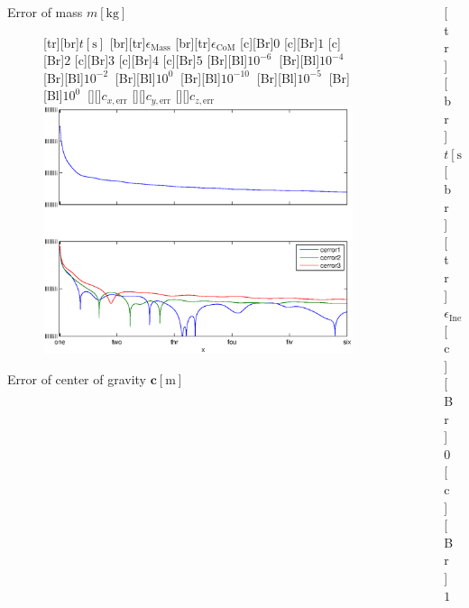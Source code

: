 \documentclass[student,noshadow]{ITRslides}
\renewcommand{\vec}[1]{\boldsymbol{#1}}
\renewcommand{\vec}[1]{\boldsymbol{#1}}
\newcommand{\scr}[1]{\mathrm{#1}}
\begin{document}
\begin{frame}
	\begin{columns}
		\centering
		\begin{column}{0.5\textwidth}
			\centering
			Error of mass $m \left[\mathrm{kg}\right]$
			\begin{figure}
				[tr][br]{$t\left[\mathrm{s}\right]$}
				[br][tr]{$\epsilon_\scr{Mass}$}
				[br][tr]{$\epsilon_\scr{CoM}$}
				[c][Br]{$0$}
				[c][Br]{$1$}
				[c][Br]{$2$}
				[c][Br]{$3$}
				[c][Br]{$4$}
				[c][Br]{$5$}
				[Br][Bl]{$10^{-6}\  $}
				[Br][Bl]{$10^{-4}\  $}
				[Br][Bl]{$10^{-2}\  $}
				[Br][Bl]{$10^0\  $}
				[Br][Bl]{$10^{-10}\  $}
				[Br][Bl]{$10^{-5}\  $}
				[Br][Bl]{$10^0\  $}
				[][]{\tiny $c_{x,\scr{err}}$}
				[][]{\tiny $c_{y,\scr{err}}$}
				[][]{\tiny $c_{z,\scr{err}}$}
				\includegraphics[width=\textwidth]{fig/mass_multi.eps}
				\label{fig:estim_mass_multi}
			\end{figure}
			Error of center of gravity $\vec{c} \left[\mathrm{m}\right]$
		\end{column}
		\begin{column}{0.5\textwidth}
			\centering
			\begin{figure}
				[tr][br]{$t\left[\mathrm{s}\right]$}
				[br][tr]{$\epsilon_{\scr{Inertia}}$}
				[c][Br]{$0$}
				[c][Br]{$1$}

\end{figure}
\end{column}
\end{columns}
\end{frame}
\end{document}
